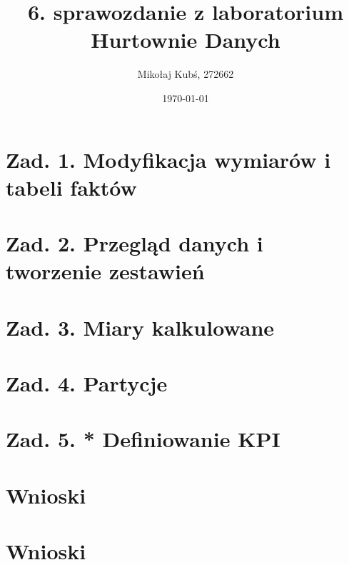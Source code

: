 \documentclass[a4paper,12pt]{article}
\title{6. sprawozdanie z laboratorium Hurtownie Danych}
\author{Mikołaj Kubś, 272662}
\date{\today}
\begin{document}
\maketitle

\section{Zad. 1. Modyfikacja wymiarów i tabeli faktów}
\section{Zad. 2. Przegląd danych i tworzenie zestawień}
\section{Zad. 3. Miary kalkulowane}
\section{Zad. 4. Partycje}
\section{Zad. 5. * Definiowanie KPI}
\section{Wnioski}

\section{Wnioski}

\printbibliography
\end{document}
